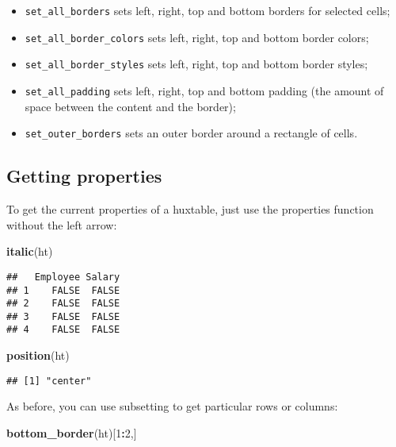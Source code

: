 \documentclass[]{article}
\newenvironment{Shaded}{\begin{snugshade}}{\end{snugshade}}
\newcommand{\KeywordTok}[1]{\textcolor[rgb]{0.13,0.29,0.53}{\textbf{#1}}}
\newcommand{\DecValTok}[1]{\textcolor[rgb]{0.00,0.00,0.81}{#1}}
\newcommand{\OperatorTok}[1]{\textcolor[rgb]{0.81,0.36,0.00}{\textbf{#1}}}
\newcommand{\NormalTok}[1]{#1}
\providecommand{\tightlist}{%
  \setlength{\itemsep}{0pt}\setlength{\parskip}{0pt}}
\begin{document}
\begin{itemize}
\tightlist
\item
  \texttt{set\_all\_borders} sets left, right, top and bottom borders
  for selected cells;
\item
  \texttt{set\_all\_border\_colors} sets left, right, top and bottom
  border colors;
\item
  \texttt{set\_all\_border\_styles} sets left, right, top and bottom
  border styles;
\item
  \texttt{set\_all\_padding} sets left, right, top and bottom padding
  (the amount of space between the content and the border);
\item
  \texttt{set\_outer\_borders} sets an outer border around a rectangle
  of cells.
\end{itemize}

\subsection{Getting properties}\label{getting-properties}

To get the current properties of a huxtable, just use the properties
function without the left arrow:

\begin{Shaded}
\begin{Highlighting}[]
\KeywordTok{italic}\NormalTok{(ht)}
\end{Highlighting}
\end{Shaded}

\begin{verbatim}
##   Employee Salary
## 1    FALSE  FALSE
## 2    FALSE  FALSE
## 3    FALSE  FALSE
## 4    FALSE  FALSE
\end{verbatim}

\begin{Shaded}
\begin{Highlighting}[]
\KeywordTok{position}\NormalTok{(ht)}
\end{Highlighting}
\end{Shaded}

\begin{verbatim}
## [1] "center"
\end{verbatim}

\FloatBarrier

As before, you can use subsetting to get particular rows or columns:

\begin{Shaded}
\begin{Highlighting}[]
\KeywordTok{bottom_border}\NormalTok{(ht)[}\DecValTok{1}\OperatorTok{:}\DecValTok{2}\NormalTok{,]}
\end{Highlighting}
\end{Shaded}
\end{document}
